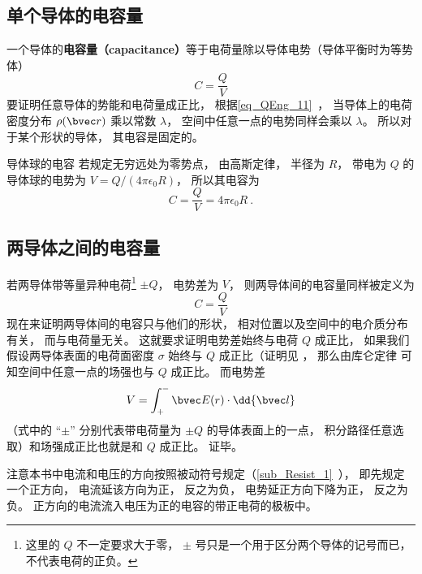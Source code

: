 

\subsection{单个导体的电容量}

一个导体的\textbf{电容量（capacitance）}等于电荷量除以导体电势（导体平衡时为等势体）
\begin{equation}\label{eq_Cpctor_2}
C = \frac{Q}{V}
\end{equation}
要证明任意导体的势能和电荷量成正比， 根据\autoref{eq_QEng_11}~， 当导体上的电荷密度分布 $\rho(\bvec r)$ 乘以常数 $\lambda$， 空间中任意一点的电势同样会乘以 $\lambda$。 所以对于某个形状的导体， 其电容是固定的。

\begin{example}{导体球的电容}\label{ex_Cpctor_1}
若规定无穷远处为零势点， 由高斯定律， 半径为 $R$， 带电为 $Q$ 的导体球的电势为 $V = Q/(4\pi\epsilon_0 R)$， 所以其电容为
\begin{equation}\label{eq_Cpctor_1}
C = \frac{Q}{V} = 4\pi\epsilon_0 R~.
\end{equation}
\end{example}

\subsection{两导体之间的电容量}
若两导体带等量异种电荷\footnote{这里的 $Q$ 不一定要求大于零， $\pm$ 号只是一个用于区分两个导体的记号而已， 不代表电荷的正负。} $\pm Q$， 电势差为 $V$， 则两导体间的电容量同样被定义为
\begin{equation}
C = \frac{Q}{V}
\end{equation}
现在来证明两导体间的电容只与他们的形状， 相对位置以及空间中的电介质分布有关， 而与电荷量无关。 这就要求证明电势差始终与电荷 $Q$ 成正比， 如果我们假设两导体表面的电荷面密度 $\sigma$ 始终与 $Q$ 成正比（证明见%
， 那么由库仑定律%
可知空间中任意一点的场强也与 $Q$ 成正比。 而电势差
\begin{equation}
V = \int_+^- \bvec E(r) \cdot \dd{\bvec l}
\end{equation}
（式中的 “$\pm$” 分别代表带电荷量为 $\pm Q$ 的导体表面上的一点， 积分路径任意选取）和场强成正比也就是和 $Q$ 成正比。 证毕。

注意本书中电流和电压的方向按照被动符号规定（\autoref{sub_Resist_1}~）， 即先规定一个正方向， 电流延该方向为正， 反之为负， 电势延正方向下降为正， 反之为负。 正方向的电流流入电压为正的电容的带正电荷的极板中。

